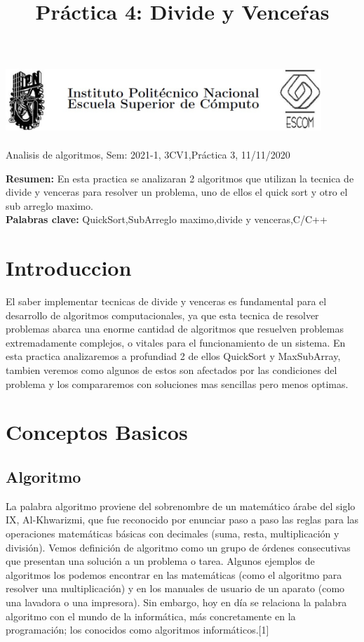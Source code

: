 \documentclass[spanish]{article}
\title {Práctica 4: Divide y Venceŕas}
\begin{document}
	\centerline{\includegraphics[width=450px,height=100px]{header}}
	\centerline{Analisis de algoritmos, Sem: 2021-1, 3CV1,Práctica  3, 11/11/2020}
	\centerline{}
	\bigskip
	\justify
	\textbf{Resumen:}	
	En esta practica se analizaran 2 algoritmos que utilizan la tecnica de divide y venceras para resolver un problema, uno de ellos el quick sort y otro el sub arreglo maximo.\\
	\textbf{Palabras clave:}
	QuickSort,SubArreglo maximo,divide y venceras,C/C++
	\section{Introduccion}
	El saber implementar tecnicas de divide y venceras es fundamental para el desarrollo de algoritmos computacionales, ya que esta tecnica de resolver problemas abarca una enorme cantidad de algoritmos que resuelven problemas extremadamente complejos, o vitales para el funcionamiento de un sistema. En esta practica analizaremos a profundiad 2 de ellos QuickSort y MaxSubArray, tambien veremos como algunos de estos son afectados por las condiciones del problema y los compararemos con soluciones mas sencillas pero menos optimas.
	\section{Conceptos Basicos}
	\subsection{Algoritmo}
	La palabra algoritmo proviene del sobrenombre de un matemático árabe del siglo IX, Al-Khwarizmi, que fue reconocido por enunciar paso a paso las reglas para las operaciones matemáticas básicas con decimales (suma, resta, multiplicación y división).	
	Vemos definición de algoritmo como un grupo de órdenes consecutivas que presentan una solución a un problema o tarea. Algunos ejemplos de algoritmos los podemos encontrar en las matemáticas (como el algoritmo para resolver una multiplicación) y en los manuales de usuario de un aparato (como una lavadora o una impresora).	
	Sin embargo, hoy en día se relaciona la palabra algoritmo con el mundo de la informática, más concretamente en la programación; los conocidos como algoritmos informáticos.[1]
\end{document}
